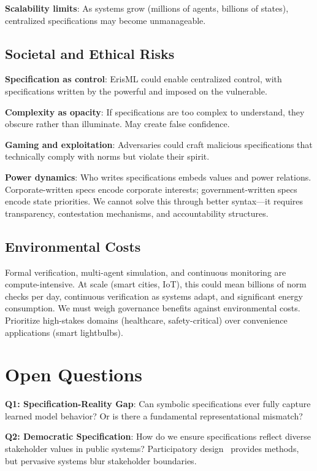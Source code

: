 \documentclass[conference]{IEEEtran}
\begin{document}
\textbf{Scalability limits}: As systems grow (millions of agents,
billions of states), centralized specifications may become unmanageable.

\subsection{Societal and Ethical Risks}

\textbf{Specification as control}: ErisML could enable centralized
control, with specifications written by the powerful and imposed on the
vulnerable.

\textbf{Complexity as opacity}: If specifications are too complex to
understand, they obscure rather than illuminate. May create false
confidence.

\textbf{Gaming and exploitation}: Adversaries could craft malicious
specifications that technically comply with norms but violate their
spirit.

\textbf{Power dynamics}: Who writes specifications embeds values and
power relations. Corporate-written specs encode corporate interests;
government-written specs encode state priorities. We cannot solve this
through better syntax---it requires transparency, contestation
mechanisms, and accountability structures.

\subsection{Environmental Costs}

Formal verification, multi-agent simulation, and continuous monitoring
are compute-intensive. At scale (smart cities, IoT), this could mean
billions of norm checks per day, continuous verification as systems
adapt, and significant energy consumption.
We must weigh governance benefits against environmental costs.
Prioritize high-stakes domains (healthcare, safety-critical) over
convenience applications (smart lightbulbs).

\section{Open Questions}
\label{sec:open-questions}

\textbf{Q1: Specification-Reality Gap}: Can symbolic specifications ever
fully capture learned model behavior? Or is there a fundamental
representational mismatch?

\textbf{Q2: Democratic Specification}: How do we ensure specifications
reflect diverse stakeholder values in public systems? Participatory
design~\cite{simonsen2012} provides methods, but pervasive systems blur stakeholder
boundaries.
\end{document}
